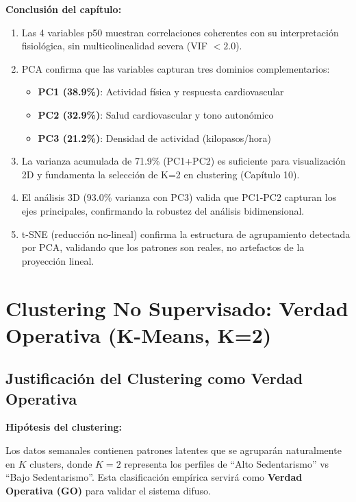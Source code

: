 \documentclass[12pt,letterpaper,twoside]{report}
\begin{document}
\begin{conclusionbox}
\textbf{Conclusión del capítulo:}

\begin{enumerate}[noitemsep]
    \item Las 4 variables p50 muestran correlaciones coherentes con su interpretación fisiológica, sin multicolinealidad severa (VIF $< 2.0$).
    
    \item PCA confirma que las variables capturan tres dominios complementarios:
    \begin{itemize}[noitemsep]
        \item \textbf{PC1 (38.9\%)}: Actividad física y respuesta cardiovascular
        \item \textbf{PC2 (32.9\%)}: Salud cardiovascular y tono autonómico
        \item \textbf{PC3 (21.2\%)}: Densidad de actividad (kilopasos/hora)
    \end{itemize}
    
    \item La varianza acumulada de 71.9\% (PC1+PC2) es suficiente para visualización 2D y fundamenta la selección de K=2 en clustering (Capítulo 10).
    
    \item El análisis 3D (93.0\% varianza con PC3) valida que PC1-PC2 capturan los ejes principales, confirmando la robustez del análisis bidimensional.
    
    \item t-SNE (reducción no-lineal) confirma la estructura de agrupamiento detectada por PCA, validando que los patrones son reales, no artefactos de la proyección lineal.
\end{enumerate}
\end{conclusionbox}

\chapter{Clustering No Supervisado: Verdad Operativa (K-Means, K=2)}

\section{Justificación del Clustering como Verdad Operativa}

\begin{hipotesisbox}
\textbf{Hipótesis del clustering:}

Los datos semanales contienen patrones latentes que se agruparán naturalmente en $K$ clusters, donde $K=2$ representa los perfiles de ``Alto Sedentarismo'' vs ``Bajo Sedentarismo''. Esta clasificación empírica servirá como \textbf{Verdad Operativa (GO)} para validar el sistema difuso.
\end{hipotesisbox}
\end{document}
